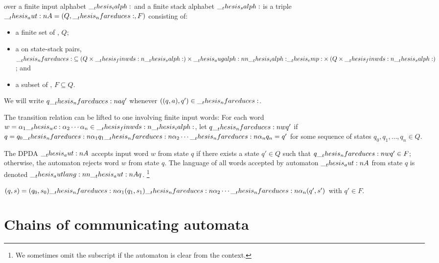 \begin{definition}
   over a finite input alphabet $\__thesis_ialph:$ and a finite stack alphabet $\__thesis_salph:$ is a triple $\aut{A} = (Q, \mathord{\nfareduces}, F)$ consisting of:
  \begin{itemize}
  \item a finite set of , $Q$;
  \item a  on state-stack pairs, $\mathord{\nfareduces} \subseteq (Q \times \finwds{\salph}) \times \augalph{\ialph}{\emp} \times (Q \times \finwds{\salph})$; and
  \item a subset of , $F \subseteq Q$.
  \end{itemize}

  We will write $q \nfareduces[a] q'$ whenever $((q, a), q') \in \mathord{\nfareduces}$.

  The transition relation can be lifted to one involving finite input words: For each word $w = \alpha_1 \wc \alpha_2 \dotsm \alpha_n \in \finwds{\ialph}$, let $q \nfareduces[w] q'$ if $q = q_0 \nfareduces[\alpha_1] q_1 \nfareduces[\alpha_2] \dotsb \nfareduces[\alpha_n] q_n = q'$ for some sequence of states $q_0, q_1, \dotsc, q_n \in Q$.

  The \ac{DPDA} $\__thesis_aut:n {A}$ accepts input word $w$ from state $q$ if there exists a state $q' \in Q$ such that $q \nfareduces[w] q' \in F$;
  otherwise, the automaton rejects word $w$ from state $q$.
  The language of all words accepted by automaton $\__thesis_aut:n {A}$ from state $q$ is denoted $\__thesis_autlang:nn {\__thesis_aut:n {A}} {q}$.%
  \footnote{We sometimes omit the subscript if the automaton is clear from the context.}

  $(q, s) = (q_0, s_0) \nfareduces[\alpha_1] (q_1, s_1) \nfareduces[\alpha_2] \dotsb \nfareduces[\alpha_n] (q', s')$ with $q' \in F$.
\end{definition}


\section{Chains of communicating automata}

